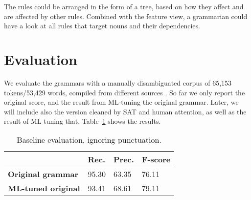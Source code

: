 \documentclass[11pt]{article}
\begin{document}
The rules could be arranged in the form of a tree, based on how they affect and are affected by other rules. Combined with the feature view, a grammarian could have a look at all rules that target nouns and their dependencies.


\section{Evaluation}

We evaluate the grammars with a manually disambiguated corpus of 65,153 tokens/53,429 words,
compiled from different sources \cite{aduriz2006epec}.
So far we only report the original score, and the result from ML-tuning the original grammar.
Later, we will include also the version cleaned by SAT and human attention, as well as
the result of ML-tuning that.
Table~\ref{table:res} shows the results.

\begin{table}[]
\centering
\label{table:res}
\begin{tabular}{l|l|l|l|}
\cline{2-4}
                                                 & \textbf{Rec.} & \textbf{Prec.} & \textbf{F-score} \\ \hline
\multicolumn{1}{|l|}{\textbf{Original grammar}}  & 95.30         & 63.35          & 76.11           \\ \hline
\multicolumn{1}{|l|}{\textbf{ML-tuned original}} & 93.41         & 68.61          & 79.11             \\ \hline
\end{tabular}
\caption{Baseline evaluation, ignoring punctuation.}
\end{table}



\end{document}
